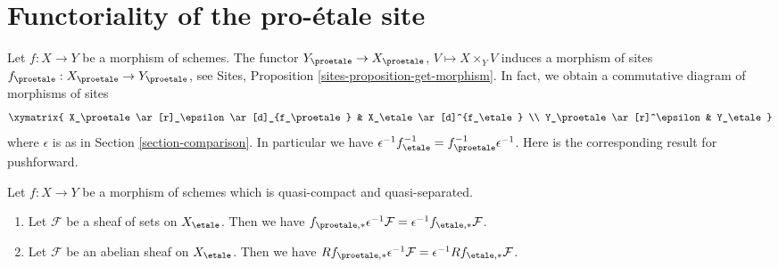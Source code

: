 \section{Functoriality of the pro-\'etale site}
\label{section-morphism}

\noindent
Let $f : X \to Y$ be a morphism of schemes. The functor
$Y_\proetale \to X_\proetale$, $V \mapsto X \times_Y V$
induces a morphism of sites $f_\proetale : X_\proetale \to Y_\proetale$, see
Sites, Proposition \ref{sites-proposition-get-morphism}.
In fact, we obtain a commutative diagram of morphisms of sites
$$
\xymatrix{
X_\proetale \ar[r]_\epsilon \ar[d]_{f_\proetale} &
X_\etale \ar[d]^{f_\etale} \\
Y_\proetale \ar[r]^\epsilon & Y_\etale
}
$$
where $\epsilon$ is as in Section \ref{section-comparison}.
In particular we have
$\epsilon^{-1} f_\etale^{-1} = f_\proetale^{-1} \epsilon^{-1}$.
Here is the corresponding result for pushforward.

\begin{lemma}
\label{lemma-morphism-comparison}
Let $f : X \to Y$ be a morphism of schemes which is quasi-compact and
quasi-separated.
\begin{enumerate}
\item Let $\mathcal{F}$ be a sheaf of sets on $X_\etale$. Then we have
$f_{\proetale, *}\epsilon^{-1}\mathcal{F} =
\epsilon^{-1}f_{\etale, *}\mathcal{F}$.
\item Let $\mathcal{F}$ be an abelian sheaf on $X_\etale$. Then we have
$Rf_{\proetale, *}\epsilon^{-1}\mathcal{F} =
\epsilon^{-1}Rf_{\etale, *}\mathcal{F}$.
\end{enumerate}
\end{lemma}

